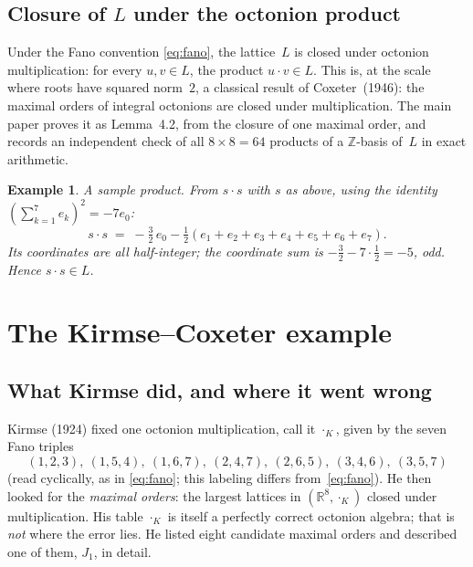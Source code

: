 \documentclass[11pt]{amsart}
\newcommand{\ZZ}{\mathbb{Z}}
\newcommand{\RR}{\mathbb{R}}
\newtheorem{example}{Example}[section]
\begin{document}
\subsection*{Closure of $L$ under the octonion product}

Under the Fano convention \eqref{eq:fano}, the lattice~$L$ is closed
under octonion multiplication: for every $u, v \in L$, the product
$u \cdot v \in L$.  This is, at the scale where roots have squared norm~$2$, a classical
result of Coxeter~(1946): the maximal orders of integral octonions
are closed under multiplication.  The main paper proves it as
Lemma~4.2, from the closure of one maximal order, and records an
independent check of all $8 \times 8 = 64$ products of a
$\ZZ$-basis of~$L$ in exact arithmetic.

\begin{example}
A sample product.  From $s \cdot s$ with $s$ as above, using the
identity $(\sum_{k=1}^{7} e_k)^2 = -7 e_0$:
\[
  s \cdot s \;=\;
    -\tfrac{3}{2}\, e_0 - \tfrac{1}{2}(e_1 + e_2 + e_3 + e_4 + e_5
    + e_6 + e_7).
\]
Its coordinates are all half-integer; the coordinate sum is
$-\tfrac{3}{2} - 7 \cdot \tfrac{1}{2} = -5$, odd.  Hence
$s \cdot s \in L$.
\end{example}

\section{The Kirmse--Coxeter example}\label{sec:kirmse}

\subsection*{What Kirmse did, and where it went wrong}

Kirmse (1924) fixed one octonion multiplication, call it
$\cdot_K$, given by the seven Fano triples
\[
  (1,2,3),\ (1,5,4),\ (1,6,7),\ (2,4,7),\ (2,6,5),\ (3,4,6),\ (3,5,7)
\]
(read cyclically, as in \eqref{eq:fano}; this labeling differs
from~\eqref{eq:fano}).  He then looked for the \emph{maximal orders}:
the largest lattices in $(\RR^8, \cdot_K)$ closed under multiplication.
His table $\cdot_K$ is itself a perfectly correct octonion algebra;
that is \emph{not} where the error lies.  He listed eight candidate
maximal orders and described one of them, $J_1$, in detail.
\end{document}
